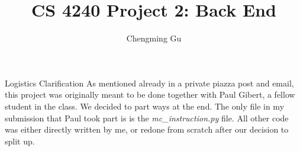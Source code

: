 \documentclass[letterpaper,12pt]{article}
\theoremstyle{definition}
\begin{document}
    \title{CS 4240 Project 2: Back End}
    \author{Chengming Gu}
    \maketitle

    \begin{section}{Logistics Clarification}
        As mentioned already in a private piazza post and email, this project was originally meant to be done together with Paul Gibert, a fellow student in the class. We decided to part ways at the end. The only file in my submission that Paul took part is is the \textit{mc\_instruction.py} file. All other code was either directly written by me, or redone from scratch after our decision to split up.
    \end{section}
\end{document}
